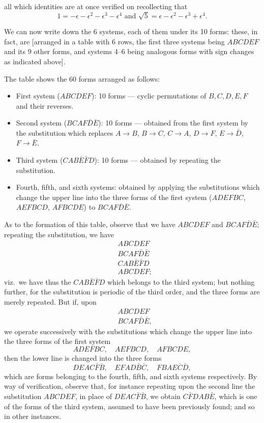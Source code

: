 \documentclass[11pt,a4paper]{book}
\begin{document}
all which identities are at once verified on recollecting that
\[
1 = -\epsilon - \epsilon^2 - \epsilon^3 - \epsilon^4 \text{ and } \sqrt{5} = \epsilon - \epsilon^2 - \epsilon^3 + \epsilon^4.
\]

We can now write down the 6 systems, each of them under its 10 forms:
these, in fact, are [arranged in a table with 6 rows, the first three systems
being $ABCDEF$ and its 9 other forms, and systems 4--6 being analogous
forms with sign changes as indicated above].

The table shows the 60 forms arranged as follows:
\begin{itemize}
\item First system ($ABCDEF$): 10 forms --- cyclic permutations of $B,C,D,E,F$
and their reverses.
\item Second system ($BCAF\bar{D}\bar{E}$): 10 forms --- obtained from the first system
by the substitution which replaces $A \to B$, $B \to C$, $C \to A$, $D \to F$, $E \to \bar{D}$, $F \to \bar{E}$.
\item Third system ($CAB\bar{E}\bar{F}D$): 10 forms --- obtained by repeating
the substitution.
\item Fourth, fifth, and sixth systems: obtained by applying the substitutions
which change the upper line into the three forms of the first system
($ADEFBC$, $AEFBCD$, $AFBCDE$) to $BCAF\bar{D}\bar{E}$.
\end{itemize}

As to the formation of this table, observe that we have $ABCDEF$ and $BCAF\bar{D}\bar{E}$;
repeating the substitution, we have
\begin{align*}
&ABCDEF\\
&BCAF\bar{D}\bar{E}\\
&CAB\bar{E}\bar{F}D\\
&ABCDEF;
\end{align*}
viz.\ we have thus the $CAB\bar{E}\bar{F}D$ which belongs to the third system; but nothing
further, for the substitution is periodic of the third order, and the three forms are
merely repeated. But if, upon
\begin{align*}
&ABCDEF\\
&BCAF\bar{D}\bar{E},
\end{align*}
we operate successively with the substitutions which change the upper line into the
three forms of the first system
\[
ADEFBC, \quad AEFBCD, \quad AFBCDE,
\]
then the lower line is changed into the three forms
\[
DEAC\bar{F}\bar{B}, \quad EFAD\bar{B}\bar{C}, \quad FBAE\bar{C}\bar{D},
\]
which are forms belonging to the fourth, fifth, and sixth systems respectively.
By way of verification, observe that, for instance repeating upon the second line the
substitution $ABCDEF$, in place of $DEAC\bar{F}\bar{B}$, we obtain $C\bar{F}DAB\bar{E}$, which is one
of the forms of the third system, assumed to have been previously found; and so in
other instances.
\end{document}
